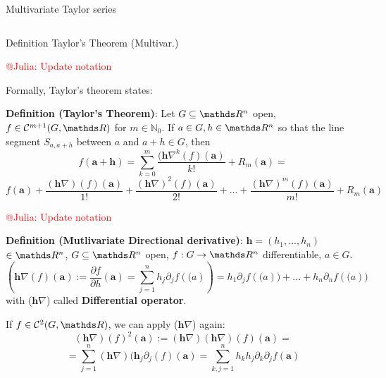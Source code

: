 \begin{vbframe}{Multivariate Taylor series}
\begin{columns}
\begin{column}{0.3\textwidth}
    \end{column}
  \end{columns}  


\end{vbframe}

\begin{vbframe}{Definition Taylor's Theorem (Multivar.)}  

\textcolor{red}{@Julia: Update notation}

Formally, Taylor's theorem states: 
    
\textbf{Definition (Taylor's Theorem)}: Let $G \subseteq \R^{n}$ open, $f \in \mathcal{C}^{m+1}(G,\R)$ for $m \in \mathbb{N}_0$.
If $a \in G, h \in \R^{n}$ so that the line segment $S_{a, a+h}$ between $a$ and $a+h \in G$, then
$$f(\bm{a+h}) = \sum_{k=0}^{m} \frac{(\bm{h}\nabla^{k}(f)(\bm{a})}{k!} + R_{m}(\bm{a}) = $$
$$f(\bm{a}) + \frac{(\bm{h}\nabla)(f)(\bm{a})}{1!} + \frac{(\bm{h}\nabla)^{2}(f)(\bm{a})}{2!} + ... + \frac{(\bm{h}\nabla)^{m}(f)(\bm{a})}{m!} + R_{m}(\bm{a})$$

\framebreak 

\textcolor{red}{@Julia: Update notation}

\textbf{Definition (Mutlivariate Directional derivative)}: $\bm{h} = (h_{1}, ..., h_{n})$ $\in \R^{n}$, $G \subseteq \R^{n}$ open, $f : G \rightarrow \R^{n}$ differentiable, $a \in G$.
$$(\bm{h}\nabla(f)(\bm{a}) := \frac{\partial f}{\partial h}(\bm{a}) = \sum_{j=1}^{n} h_{j}\partial_{j}f(\bm(a)) = h_{1}\partial_{j}f(\bm(a)) + ... + h_{n}\partial_{n}f(\bm(a))$$
with ($\bm{h}\nabla$) called \textbf{Differential operator}.

\vspace*{0.2cm}

If $f \in \mathcal{C}^{2}(G,\R)$, we can apply ($\bm{h}\nabla$) again:
$$(\bm{h}\nabla)(f)^{2}(\bm{a}) := (\bm{h}\nabla)(\bm{h}\nabla)(f)(\bm{a}) = $$
$$ = \sum_{j=1}^{n}(\bm{h}\nabla)(\bm{h}_{j}\partial_{j}(f)(\bm{a}) = \sum_{k,j=1}^{n}h_{k}h_{j}\partial_{k}\partial_{j}f(\bm{a})$$


\end{vbframe}


